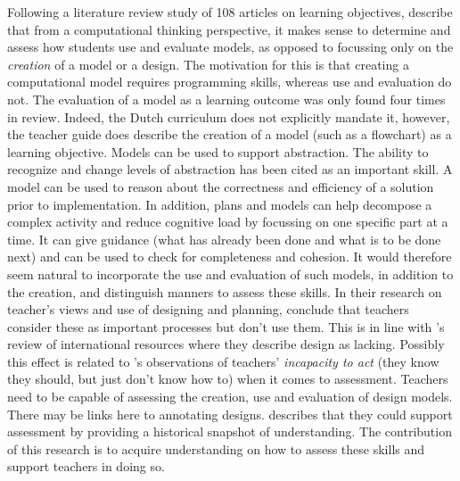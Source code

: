 Following a literature review study of 108 articles on learning objectives,  describe that from a computational thinking perspective, it makes sense to determine and assess how students use and evaluate models, as opposed to focussing only on the \emph{creation} of a model or a design. The motivation for this is that creating a computational model requires programming skills, whereas use and evaluation do not.
The evaluation of a model as a learning outcome was only found four times in \citeauthor{rich2017CSlearningGoals} review. Indeed, the Dutch curriculum does not explicitly mandate it, however, the teacher guide does describe the creation of a model (such as a flowchart) as a learning objective. Models can be used to support abstraction. The ability to recognize and change levels of abstraction has been cited as an important skill\cite{statter2016teachingAbstractThinking}. A model can be used to reason about the correctness and efficiency of a solution prior to implementation. In addition, plans and models can help decompose a complex activity and reduce cognitive load by focussing on one specific part at a time\cite{Smetsers2017}. It can give guidance (what has already been done and what is to be done next) and can be used to check for completeness and cohesion\cite{waite2018designPlanWriting}. It would therefore seem natural to incorporate the use and evaluation of such models, in addition to the creation, and distinguish manners to assess these skills. In their research on teacher's views and use of designing and planning, \cite{waite2018designPlanWriting} conclude that teachers consider these as important processes but don't use them. This is in line with  's review of international resources where they describe design as lacking. Possibly this effect is related to \citeauthor{yadav2016pck}'s observations of teachers' \emph{incapacity to act} (they know they should, but just don't know how to) when it comes to assessment. Teachers need to be capable of assessing the creation, use and evaluation of design models. There may be links here to annotating designs.  describes that they could support assessment by providing a historical snapshot of understanding. The contribution of this research is to acquire understanding on how to assess these skills and support teachers in doing so.



